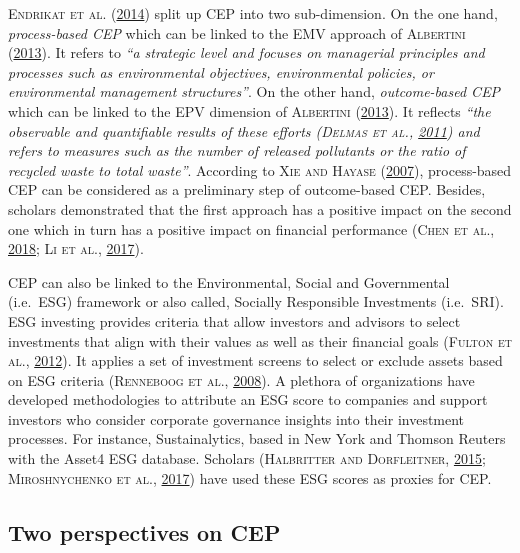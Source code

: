 \documentclass[12pt,]{article}
\begin{document}
\textsc{Endrikat et al.}
(\protect\hyperlink{ref-EndrikatMakingsenseconflicting2014}{2014}) split
up CEP into two sub-dimension. On the one hand, \emph{process-based CEP}
which can be linked to the EMV approach of \textsc{Albertini}
(\protect\hyperlink{ref-Albertini2013}{2013}). It refers to \emph{``a
strategic level and focuses on managerial principles and processes such
as environmental objectives, environmental policies, or environmental
management structures''}. On the other hand, \emph{outcome-based CEP}
which can be linked to the EPV dimension of \textsc{Albertini}
(\protect\hyperlink{ref-Albertini2013}{2013}). It reflects \emph{``the
observable and quantifiable results of these efforts (\textsc{Delmas et
al.}, \protect\hyperlink{ref-Delmas2011a}{2011}) and refers to measures
such as the number of released pollutants or the ratio of recycled waste
to total waste''}. According to \textsc{Xie and Hayase}
(\protect\hyperlink{ref-Xie2007}{2007}), process-based CEP can be
considered as a preliminary step of outcome-based CEP. Besides, scholars
demonstrated that the first approach has a positive impact on the second
one which in turn has a positive impact on financial performance
(\textsc{Chen et al.},
\protect\hyperlink{ref-Chencrosscountrycomparisongreen2018}{2018};
\textsc{Li et al.}, \protect\hyperlink{ref-Li2017}{2017}).

CEP can also be linked to the Environmental, Social and Governmental
(i.e.~ESG) framework or also called, Socially Responsible Investments
(i.e.~SRI). ESG investing provides criteria that allow investors and
advisors to select investments that align with their values as well as
their financial goals (\textsc{Fulton et al.},
\protect\hyperlink{ref-Fulton2012}{2012}). It applies a set of
investment screens to select or exclude assets based on ESG criteria
(\textsc{Renneboog et al.},
\protect\hyperlink{ref-Renneboog2008}{2008}). A plethora of
organizations have developed methodologies to attribute an ESG score to
companies and support investors who consider corporate governance
insights into their investment processes. For instance, Sustainalytics,
based in New York and Thomson Reuters with the Asset4 ESG database.
Scholars (\textsc{Halbritter and Dorfleitner},
\protect\hyperlink{ref-Halbritter2015}{2015}; \textsc{Miroshnychenko et
al.},
\protect\hyperlink{ref-MiroshnychenkoGreenpracticesfinancial2017}{2017})
have used these ESG scores as proxies for CEP.

\subsection{Two perspectives on CEP}\label{two-perspectives-on-cep}
\end{document}
